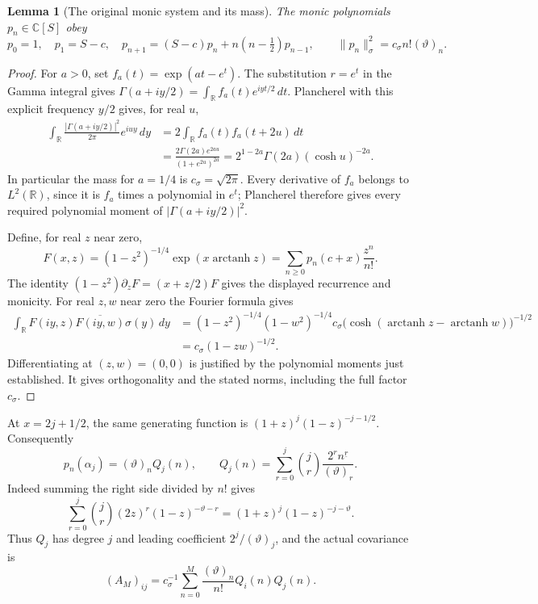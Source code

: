 \documentclass[11pt,a4paper]{article}
\newtheorem{lemma}[theorem]{Lemma}
\newcommand{\C}{\mathbb C}
\newcommand{\R}{\mathbb R}
\begin{document}
\begin{lemma}[The original monic system and its mass]
The monic polynomials $p_n\in\C[S]$ obey
\[
 p_0=1,\quad p_1=S-c,\quad
 p_{n+1}=(S-c)p_n+n(n-\tfrac12)p_{n-1},\qquad
 \|p_n\|_\sigma^2=c_\sigma n!(\vartheta)_n.
\]
\end{lemma}
\begin{proof}
For $a>0$, set $f_a(t)=\exp(at-e^t)$. The substitution $r=e^t$ in
the Gamma integral gives
$\Gamma(a+iy/2)=\int_{\R}f_a(t)e^{iyt/2}\,dt$.
Plancherel with this explicit frequency $y/2$ gives, for real $u$,
\begin{align*}
 \int_{\R}\frac{|\Gamma(a+iy/2)|^2}{2\pi}e^{iuy}\,dy
 &=2\int_{\R}f_a(t)f_a(t+2u)\,dt\\
 &=\frac{2\Gamma(2a)e^{2au}}{(1+e^{2u})^{2a}}
 =2^{1-2a}\Gamma(2a)(\cosh u)^{-2a}.
\end{align*}
In particular the mass for $a=1/4$ is $c_\sigma=\sqrt{2\pi}$.
Every derivative of $f_a$ belongs to $L^2(\R)$, since it is $f_a$
times a polynomial in $e^t$; Plancherel therefore gives every required
polynomial moment of $|\Gamma(a+iy/2)|^2$.

Define, for real $z$ near zero,
\[
 F(x,z)=(1-z^2)^{-1/4}\exp(x\operatorname{arctanh}z)
 =\sum_{n\ge0}p_n(c+x)\frac{z^n}{n!}.
\]
The identity $(1-z^2)\partial_zF=(x+z/2)F$ gives the displayed recurrence
and monicity. For real $z,w$ near zero the Fourier formula gives
\begin{align*}
 \int_{\R}F(iy,z)\overline{F(iy,w)}\sigma(y)\,dy
 &=(1-z^2)^{-1/4}(1-w^2)^{-1/4}c_\sigma
   \bigl(\cosh(\operatorname{arctanh}z-
                       \operatorname{arctanh}w)\bigr)^{-1/2}\\
 &=c_\sigma(1-zw)^{-1/2}.
\end{align*}
Differentiating at $(z,w)=(0,0)$ is justified by the polynomial moments
just established. It gives orthogonality and the stated norms, including
the full factor $c_\sigma$.
\end{proof}

At $x=2j+1/2$, the same generating function is
$(1+z)^j(1-z)^{-j-1/2}$. Consequently
\begin{equation}\label{eq:eval}
 p_n(\alpha_j)=(\vartheta)_n Q_j(n),\qquad
 Q_j(n)=\sum_{r=0}^j\binom jr\frac{2^r n^{\underline r}}{(\vartheta)_r}.
\end{equation}
Indeed summing the right side divided by $n!$ gives
\[
 \sum_{r=0}^j\binom jr(2z)^r(1-z)^{-\vartheta-r}
 =(1+z)^j(1-z)^{-j-\vartheta}.
\]
Thus $Q_j$ has degree $j$ and leading coefficient $2^j/(\vartheta)_j$,
and the actual covariance is
\begin{equation}\label{eq:cov}
 (A_M)_{ij}=c_\sigma^{-1}\sum_{n=0}^M
          \frac{(\vartheta)_n}{n!}Q_i(n)Q_j(n).
\end{equation}
\end{document}
